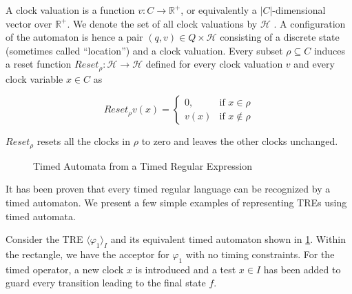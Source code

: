 \documentclass[]{sigplanconf}
\begin{document}
A clock valuation is a function $v \colon C \rightarrow \mathbb{R}^+$, or equivalently a $|C|$-dimensional vector over $\mathbb{R}^+$. We denote the set of all clock valuations by $\mathcal{H}$ . A configuration of the automaton is hence a pair $(q,v) \in Q \times \mathcal{H}$ consisting of a discrete state (sometimes called “location”) and a clock valuation. Every subset $\rho \subseteq C$ induces a reset function $Reset_\rho : \mathcal{H} \rightarrow \mathcal{H}$ defined for every clock valuation $v$ and every clock variable $x \in C$ as

\begin{equation}\label{timed_automaton}
Reset_\rho v(x) = \begin{cases}
0, & \text{if $x \in \rho$} \\
v(x) &\text{if $x \notin \rho$}
\end{cases}
\end{equation}

$Reset_\rho$ resets all the clocks in $\rho$ to zero and leaves the other clocks unchanged.

\begin{figure}
\caption{Timed Automata from a Timed Regular Expression}
\label{fig:tretoautomata}
\end{figure}

It has been proven \cite{timedregex} that every timed regular language can be recognized by a timed automaton. We present a few simple examples of representing TREs using timed automata.

Consider the TRE $\langle \varphi_1  \rangle_I$ and its equivalent timed automaton shown in \ref{fig:tretoautomata}. Within the rectangle, we have the acceptor for $\varphi_1$ with no timing constraints. For the timed operator, a new clock $x$ is introduced and a test $x \in I$ has been added to guard every transition leading to the final state $f$.
\end{document}
